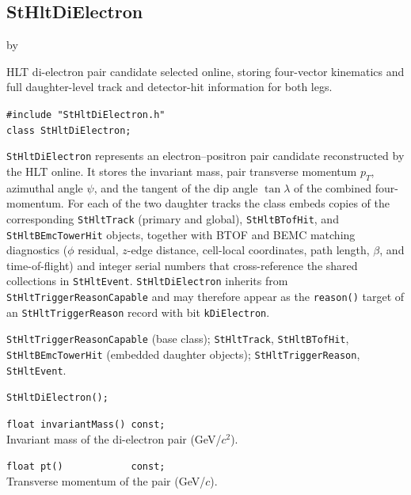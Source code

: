 \documentclass[twoside]{article}
\newcommand{\entrylabel}[1]{\mbox{\textbf{{#1}}}\hfil}%
\newenvironment{entry}
{\begin{list}{}%
    {\renewcommand{\makelabel}{\entrylabel}%
     \setlength{\labelwidth}{90pt}%
     \setlength{\leftmargin}{\labelwidth}
     \advance\leftmargin by \labelsep%
      }%
    }%
  {\end{list}}
\newcommand{\Entrylabel}[1]%
{\raisebox{0pt}[1ex][0pt]{\makebox[\labelwidth][l]%
    {\parbox[t]{\labelwidth}{\hspace{0pt}\textbf{{#1}}}}}}
\newenvironment{Entry}%
{\renewcommand{\entrylabel}{\Entrylabel}\begin{entry}}%
  {\end{entry}}
\begin{document}
\subsection{StHltDiElectron}
\label{sec:StHltDiElectron}
\begin{Entry}
\item[Summary] HLT di-electron pair candidate selected online, storing
    four-vector kinematics and full daughter-level track and detector-hit
    information for both legs.
\item[Synopsis]
    \verb+#include "StHltDiElectron.h"+\\
    \verb+class StHltDiElectron;+\\
\item[Description]
    \texttt{StHltDiElectron} represents an electron--positron pair
    candidate reconstructed by the HLT online.  It stores the invariant
    mass, pair transverse momentum $p_T$, azimuthal angle $\psi$, and
    the tangent of the dip angle $\tan\lambda$ of the combined
    four-momentum.  For each of the two daughter tracks the class
    embeds copies of the corresponding \texttt{StHltTrack} (primary and
    global), \texttt{StHltBTofHit}, and \texttt{StHltBEmcTowerHit}
    objects, together with BTOF and BEMC matching diagnostics
    ($\phi$ residual, $z$-edge distance, cell-local coordinates, path
    length, $\beta$, and time-of-flight) and integer serial numbers
    that cross-reference the shared collections in \texttt{StHltEvent}.
    \texttt{StHltDiElectron} inherits from
    \texttt{StHltTriggerReasonCapable} and may therefore appear as the
    \texttt{reason()} target of an \texttt{StHltTriggerReason} record
    with bit \texttt{kDiElectron}.
\item[Related Classes]
    \texttt{StHltTriggerReasonCapable} (base class);
    \texttt{StHltTrack}, \texttt{StHltBTofHit},
    \texttt{StHltBEmcTowerHit} (embedded daughter objects);
    \texttt{StHltTriggerReason}, \texttt{StHltEvent}.
\item[Public\\ Constructors]
    \verb+StHltDiElectron();+\\
\item[Public Member\\ Functions]
    \verb+float invariantMass() const;+\\
    Invariant mass of the di-electron pair (GeV/$c^2$).

    \verb+float pt()            const;+\\
    Transverse momentum of the pair (GeV/$c$).


\end{Entry}
\end{document}
